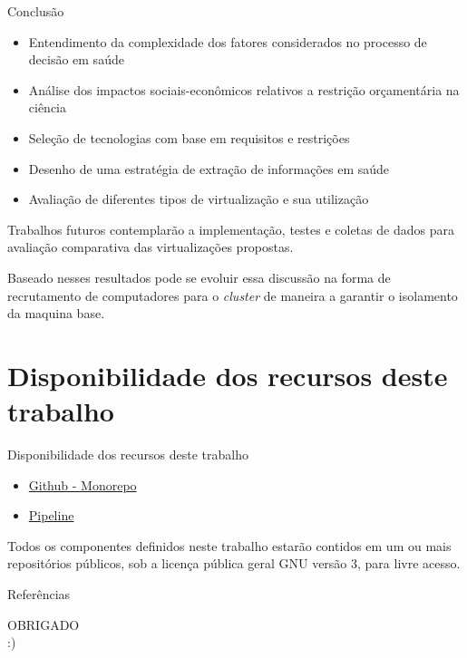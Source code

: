 \documentclass[10pt,brazil]{beamer}
\theoremstyle{definition}
\begin{document}
\begin{frame}{Conclusão}
  \begin{itemize}
    \item Entendimento da complexidade dos fatores considerados no processo de decisão em saúde
    \item Análise dos impactos sociais-econômicos relativos a restrição orçamentária na ciência
    \item Seleção de tecnologias com base em requisitos e restrições
    \item Desenho de uma estratégia de extração de informações em saúde
    \item Avaliação de diferentes tipos de virtualização e sua utilização
  \end{itemize}
  Trabalhos futuros contemplarão a implementação, testes e coletas de dados para avaliação comparativa das virtualizações propostas. 
  
  Baseado nesses resultados pode se evoluir essa discussão na forma de recrutamento de computadores para o \emph{cluster} de maneira a garantir o isolamento da maquina base.
\end{frame}


\section{Disponibilidade dos recursos deste trabalho}

\begin{frame}{Disponibilidade dos recursos deste trabalho}
  \begin{itemize}
    \item \href{https://github.com/felipefrocha/esufmg-tcc}{Github - Monorepo}
    \item \href{https://github.com/felipefrocha/esufmg-tcc/actions}{Pipeline}
  \end{itemize}
  Todos os componentes definidos neste trabalho estarão contidos em um ou mais repositórios públicos, sob a licença pública geral GNU versão 3, para livre acesso.
  
\end{frame}

\begin{frame}[allowframebreaks]{Referências}
  \small
  
\end{frame}


\begin{frame}
  \centering
  {\color{ros} OBRIGADO\\
    :)}
\end{frame}
\end{document}
